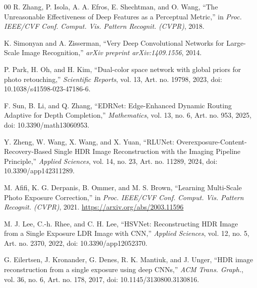 \documentclass[conference]{IEEEtran}
\begin{document}
\begin{thebibliography}{00}
R. Zhang, P. Isola, A. A. Efros, E. Shechtman, and O. Wang, ``The Unreasonable Effectiveness of Deep Features as a Perceptual Metric,'' in \textit{Proc. IEEE/CVF Conf. Comput. Vis. Pattern Recognit. (CVPR)}, 2018.

K. Simonyan and A. Zisserman, ``Very Deep Convolutional Networks for Large-Scale Image Recognition,'' \textit{arXiv preprint arXiv:1409.1556}, 2014.

P. Park, H. Oh, and H. Kim, ``Dual-color space network with global priors for photo retouching,'' \textit{Scientific Reports}, vol. 13, Art. no. 19798, 2023, doi: 10.1038/s41598-023-47186-6.

F. Sun, B. Li, and Q. Zhang, ``EDRNet: Edge-Enhanced Dynamic Routing Adaptive for Depth Completion,'' \textit{Mathematics}, vol. 13, no. 6, Art. no. 953, 2025, doi: 10.3390/math13060953.

Y. Zheng, W. Wang, X. Wang, and X. Yuan, ``RLUNet: Overexposure-Content-Recovery-Based Single HDR Image Reconstruction with the Imaging Pipeline Principle,'' \textit{Applied Sciences}, vol. 14, no. 23, Art. no. 11289, 2024, doi: 10.3390/app142311289.

M. Afifi, K. G. Derpanis, B. Ommer, and M. S. Brown, ``Learning Multi-Scale Photo Exposure Correction,'' in \textit{Proc. IEEE/CVF Conf. Comput. Vis. Pattern Recognit. (CVPR)}, 2021. \url{https://arxiv.org/abs/2003.11596}

M. J. Lee, C.-h. Rhee, and C. H. Lee, ``HSVNet: Reconstructing HDR Image from a Single Exposure LDR Image with CNN,'' \textit{Applied Sciences}, vol. 12, no. 5, Art. no. 2370, 2022, doi: 10.3390/app12052370.

G. Eilertsen, J. Kronander, G. Denes, R. K. Mantiuk, and J. Unger, ``HDR image reconstruction from a single exposure using deep CNNs,'' \textit{ACM Trans. Graph.}, vol. 36, no. 6, Art. no. 178, 2017, doi: 10.1145/3130800.3130816.

\end{thebibliography}
\end{document}
